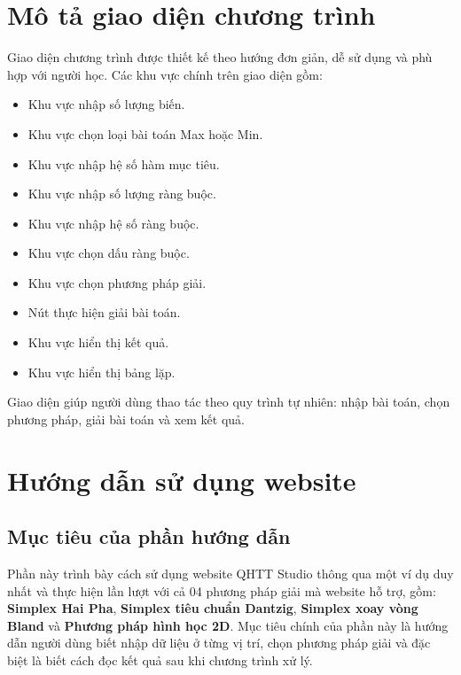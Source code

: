 \documentclass[14pt, a4paper]{extarticle}
\begin{document}
    \section{Mô tả giao diện chương trình}
    
    Giao diện chương trình được thiết kế theo hướng đơn giản, dễ sử dụng và phù hợp với người học. Các khu vực chính trên giao diện gồm:
    
    \begin{itemize}
        \item Khu vực nhập số lượng biến.
        \item Khu vực chọn loại bài toán Max hoặc Min.
        \item Khu vực nhập hệ số hàm mục tiêu.
        \item Khu vực nhập số lượng ràng buộc.
        \item Khu vực nhập hệ số ràng buộc.
        \item Khu vực chọn dấu ràng buộc.
        \item Khu vực chọn phương pháp giải.
        \item Nút thực hiện giải bài toán.
        \item Khu vực hiển thị kết quả.
        \item Khu vực hiển thị bảng lặp.
    \end{itemize}
    
    Giao diện giúp người dùng thao tác theo quy trình tự nhiên: nhập bài toán, chọn phương pháp, giải bài toán và xem kết quả.
    
    \section{Hướng dẫn sử dụng website}
    
    \subsection{Mục tiêu của phần hướng dẫn}
    
    Phần này trình bày cách sử dụng website QHTT Studio thông qua một ví dụ duy nhất và thực hiện lần lượt với cả 04 phương pháp giải mà website hỗ trợ, gồm: \textbf{Simplex Hai Pha}, \textbf{Simplex tiêu chuẩn Dantzig}, \textbf{Simplex xoay vòng Bland} và \textbf{Phương pháp hình học 2D}. Mục tiêu chính của phần này là hướng dẫn người dùng biết nhập dữ liệu ở từng vị trí, chọn phương pháp giải và đặc biệt là biết cách đọc kết quả sau khi chương trình xử lý.
    
\end{document}
